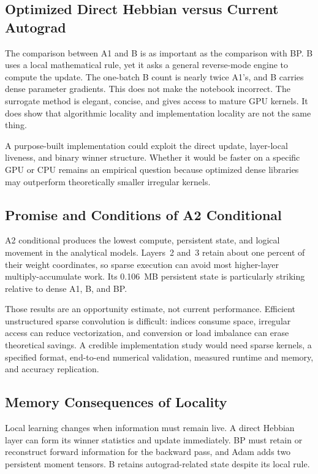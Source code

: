 \documentclass{article}
\begin{document}
    \subsection{Optimized Direct Hebbian versus Current Autograd}
    
    The comparison between A1 and B is as important as the comparison with BP. B uses a local mathematical rule, yet it asks a general reverse-mode engine to compute the update. The one-batch B count is nearly twice A1's, and B carries dense parameter gradients. This does not make the notebook incorrect. The surrogate method is elegant, concise, and gives access to mature GPU kernels. It does show that algorithmic locality and implementation locality are not the same thing.
    
    A purpose-built implementation could exploit the direct update, layer-local liveness, and binary winner structure. Whether it would be faster on a specific GPU or CPU remains an empirical question because optimized dense libraries may outperform theoretically smaller irregular kernels.
    
    \subsection{Promise and Conditions of A2 Conditional}
    
    A2 conditional produces the lowest compute, persistent state, and logical movement in the analytical models. Layers~2 and~3 retain about one percent of their weight coordinates, so sparse execution can avoid most higher-layer multiply-accumulate work. Its 0.106~MB persistent state is particularly striking relative to dense A1, B, and BP.
    
    Those results are an opportunity estimate, not current performance. Efficient unstructured sparse convolution is difficult: indices consume space, irregular access can reduce vectorization, and conversion or load imbalance can erase theoretical savings. A credible implementation study would need sparse kernels, a specified format, end-to-end numerical validation, measured runtime and memory, and accuracy replication.
    
    \subsection{Memory Consequences of Locality}
    
    Local learning changes when information must remain live. A direct Hebbian layer can form its winner statistics and update immediately. BP must retain or reconstruct forward information for the backward pass, and Adam adds two persistent moment tensors. B retains autograd-related state despite its local rule.
    
\end{document}
